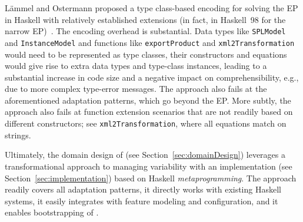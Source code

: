 L\"ammel and Ostermann proposed a type class-based encoding for
solving the EP in Haskell with relatively established extensions (in
fact, in Haskell~98 for the narrow EP)~\cite{LaemmelO06}. The encoding
overhead is substantial. Data types like \texttt{SPLModel} and
\texttt{InstanceModel} and functions like \texttt{exportProduct} and
\texttt{xml2Transformation} would need to be represented as type
classes, their constructors and equations would give rise to extra
data types and type-class instances, leading to a substantial increase
in code size and a negative impact on comprehensibility, e.g., due to
more complex type-error messages. The approach also fails at the
aforementioned adaptation patterns, which go beyond the EP. More
subtly, the approach also fails at function extension scenarios that
are not readily based on different constructors; see
\texttt{xml2Transformation}, where all equations match on strings.

Ultimately, the domain design of \hpl{} (see
Section~\ref{sec:domainDesign}) leverages a transformational approach
to managing variability with an implementation (see
Section~\ref{sec:implementation}) based on Haskell
\emph{metaprogramming}. The approach readily covers all adaptation
patterns, it directly works with existing Haskell systems, it easily
integrates with feature modeling and configuration, and it enables
bootstrapping of \hpl{}.

